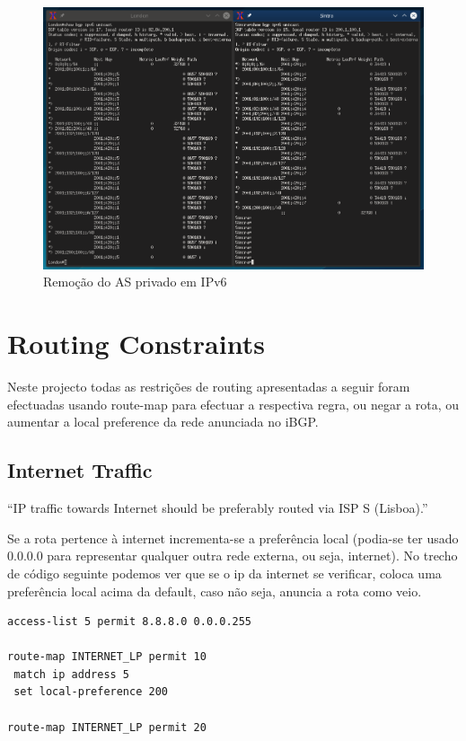 \documentclass[11pt,a4paper]{report}
\begin{document}
\begin{figure}[H]
\centerline{\includegraphics[width=340pt]{private_as_removal_ipv6.png}}
\caption{Remoção do AS privado em IPv6}
\label{schema}
\end{figure}


\section{Routing Constraints}

Neste projecto todas as restrições de routing apresentadas a seguir foram efectuadas usando route-map para efectuar a respectiva regra, ou negar a rota, ou aumentar a local preference da rede anunciada no iBGP.

\subsection{Internet Traffic}

``IP traffic towards Internet should be preferably routed via ISP S (Lisboa).''
\newline

Se a rota pertence à internet incrementa-se a preferência local (podia-se ter usado 0.0.0.0 para representar qualquer outra rede externa, ou seja, internet). No trecho de código seguinte podemos ver que se o ip da internet se verificar, coloca uma preferência local acima da default, caso não seja, anuncia a rota como veio.

\begin{lstlisting}[caption=Route-map para a Internet]
access-list 5 permit 8.8.8.0 0.0.0.255

route-map INTERNET_LP permit 10
 match ip address 5
 set local-preference 200

route-map INTERNET_LP permit 20
\end{lstlisting}
\end{document}
